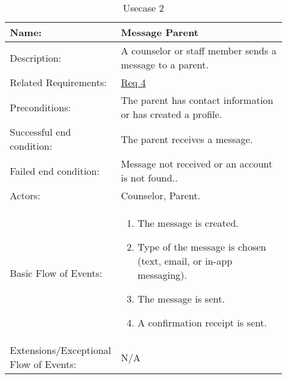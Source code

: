 \documentclass[11pt]{article}
\begin{document}
\begin{table}[!htb]
\caption{Usecase 2}
\label{des:message parent}
\begin{center}
\begin{tabular}{p{0.30\linewidth}p{0.60\linewidth}}
	Name: & Message Parent\\\hline
	Description: & A counselor or staff member sends a message to a parent.\\\hline
	Related Requirements:& \hyperlink{Req4}{Req 4}\\\hline
	Preconditions:& The parent has contact information or has created a profile.\\\hline
	Successful end condition:& The parent receives a message.\\\hline
	Failed end condition:& Message not received or an account is not found.. \\\hline
	Actors:& Counselor, Parent.\\\hline
	Basic Flow of Events: & \begin{enumerate}[topsep=0pt]
		\item The message is created.
		\item Type of the message is chosen (text, email, or in-app messaging).
		\item The message is sent.
		\item A confirmation receipt is sent.
	\end{enumerate}\\\hline
	Extensions/Exceptional Flow of Events: & \vspace*{.25em}  N/A
\end{tabular}
\end{center}
\end{table}

\end{document}
